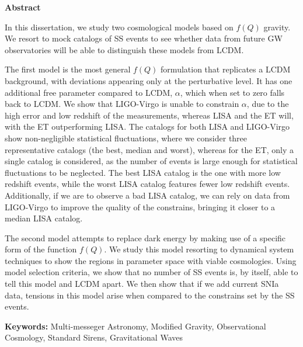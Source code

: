 
\vspace*{2cm}
\begin{center}
    \Large \bf Abstract
\end{center}
\vspace*{1cm} 
\setlength{\baselineskip}{0.6cm}


In this dissertation, we study two cosmological models based on $f(Q)$ gravity. We resort to mock catalogs of \gls{SS} events to see whether data from future \gls{GW} observatories will be able to distinguish these models from \gls{LCDM}.

The first model is the most general $f(Q)$ formulation that replicates a \gls{LCDM} background, with deviations appearing only at the perturbative level. It has one additional free parameter compared to \gls{LCDM}, $\alpha$, which when set to zero falls back to \gls{LCDM}. We show that \gls{LIGO}-Virgo is unable to constrain $\alpha$, due to the high error and low redshift of the measurements, whereas \gls{LISA} and the \gls{ET} will, with the \gls{ET} outperforming \gls{LISA}. The catalogs for both \gls{LISA} and \gls{LIGO}-Virgo show non-negligible statistical fluctuations, where we consider three representative catalogs (the best, median and worst), whereas for the \gls{ET}, only a single catalog is considered, as the number of events is large enough for statistical fluctuations to be neglected. The best \gls{LISA} catalog is the one with more low redshift events, while the worst \gls{LISA} catalog features fewer low redshift events. Additionally, if we are to observe a bad \gls{LISA} catalog, we can rely on data from \gls{LIGO}-Virgo to improve the quality of the constrains, bringing it closer to a median \gls{LISA} catalog.

The second model attempts to replace dark energy by making use of a specific form of the function $f(Q)$. We study this model resorting to dynamical system techniques to show the regions in parameter space with viable cosmologies. Using model selection criteria, we show that no number of \gls{SS} events is, by itself, able to tell this model and \gls{LCDM} apart. We then show that if we add current \gls{SNIa} data, tensions in this model arise when compared to the constrains set by the \gls{SS} events.

\vfill
\begin{flushleft}
    \textbf{Keywords:}
    Multi-messeger Astronomy, Modified Gravity, Observational Cosmology, Standard Sirens, Gravitational Waves
\end{flushleft}
